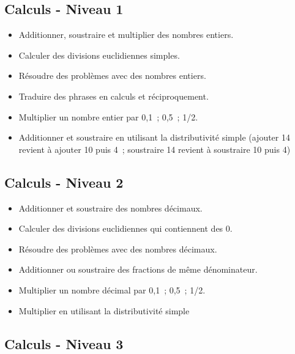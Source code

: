 \documentclass[a4paper,12pt,fleqn]{article}	
\begin{document}
\renewcommand{\labelitemi}{}

\subsection*{Calculs - Niveau 1}

\begin{itemize}
	\item {}Additionner, soustraire et multiplier des nombres entiers.
	\item {}Calculer des divisions euclidiennes simples.
	\item {}Résoudre des problèmes avec des nombres entiers.
	\item {}Traduire des phrases en calculs et réciproquement.
	\item {}Multiplier un nombre entier par 0,1 ; 0,5 ; 1/2.
	\item {}Additionner et soustraire en utilisant la distributivité simple (ajouter 14 revient à ajouter 10 puis 4 ; soustraire 14 revient à soustraire 10 puis 4)

\end{itemize}

\subsection*{Calculs - Niveau 2}

\begin{itemize}
	\item {}Additionner et soustraire des nombres décimaux.
	\item {}Calculer des divisions euclidiennes qui contiennent des 0.
	\item {}Résoudre des problèmes avec des nombres décimaux.
	\item {}Additionner ou soustraire des fractions de même dénominateur.
	\item {}Multiplier un nombre décimal par 0,1 ; 0,5 ; 1/2.
	\item {}Multiplier en utilisant la distributivité simple %

\end{itemize}

\subsection*{Calculs - Niveau 3}
\end{document}
